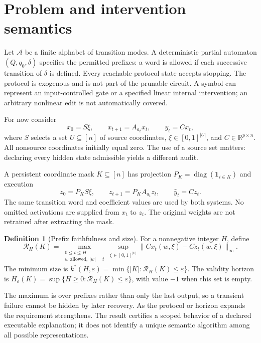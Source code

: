 \documentclass[11pt]{article}
\theoremstyle{definition}\newtheorem{definition}[theorem]{Definition}
\newcommand{\R}{\mathbb R}
\newcommand{\diag}{\operatorname{diag}}
\newcommand{\risk}{\mathcal R}
\newcommand{\one}{\mathbf 1}
\newcommand{\eps}{\varepsilon}
\begin{document}
\section{Problem and intervention semantics}
Let $\mathcal A$ be a finite alphabet of transition modes. A deterministic partial automaton $(Q,q_0,\delta)$ specifies the permitted prefixes: a word is allowed if each successive transition of $\delta$ is defined. Every reachable protocol state accepts stopping. The protocol is exogenous and is not part of the prunable circuit. A symbol can represent an input-controlled gate or a specified linear internal intervention; an arbitrary nonlinear edit is not automatically covered.

For now consider
\begin{equation}
 x_0=S\xi,\qquad x_{t+1}=A_{a_t}x_t,\qquad y_t=Cx_t,
 \label{eq:system}
\end{equation}
where $S$ selects a set $U\subseteq[n]$ of source coordinates, $\xi\in[0,1]^{|U|}$, and $C\in\R^{p\times n}$. All nonsource coordinates initially equal zero. The use of a source set matters: declaring every hidden state admissible yields a different audit.

A persistent coordinate mask $K\subseteq[n]$ has projection $P_K=\diag(\one_{i\in K})$ and execution
\begin{equation}
 z_0=P_KS\xi,\qquad z_{t+1}=P_K A_{a_t}z_t,\qquad \hat y_t=Cz_t.
 \label{eq:mask}
\end{equation}
The same transition word and coefficient values are used by both systems. No omitted activations are supplied from $x_t$ to $z_t$. The original weights are not retrained after extracting the mask.

\begin{definition}[Prefix faithfulness and size]
For a nonnegative integer $H$, define
\begin{equation}
 \risk_H(K)=\max_{\substack{0\le t\le H\\w\text{ allowed},\ |w|=t}}
 \sup_{\xi\in[0,1]^{|U|}}\|C x_t(w,\xi)-Cz_t(w,\xi)\|_\infty.
 \label{eq:risk}
\end{equation}
The minimum size is $k^*(H,\eps)=\min\{|K|:\risk_H(K)\le\eps\}$. The validity horizon is $H_\eps(K)=\sup\{H\ge0:\risk_H(K)\le\eps\}$, with value $-1$ when this set is empty.
\end{definition}
The maximum is over prefixes rather than only the last output, so a transient failure cannot be hidden by later recovery. As the protocol or horizon expands the requirement strengthens. The result certifies a scoped behavior of a declared executable explanation; it does not identify a unique semantic algorithm among all possible representations.
\end{document}
